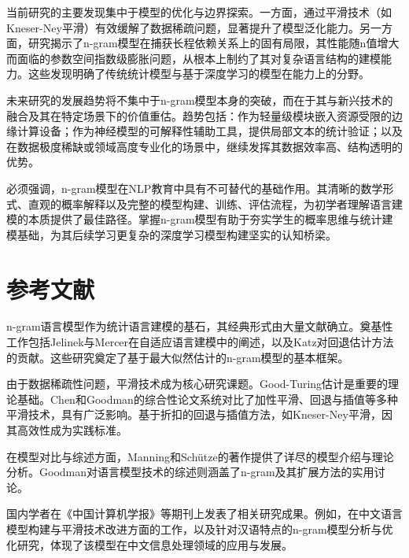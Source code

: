 \documentclass[10pt,a4paper,twocolumn]{article}
\begin{document}
当前研究的主要发现集中于模型的优化与边界探索。一方面，通过平滑技术（如Kneser-Ney平滑）有效缓解了数据稀疏问题，显著提升了模型泛化能力\cite{anonndkneser1995improved}。另一方面，研究揭示了n-gram模型在捕获长程依赖关系上的固有局限，其性能随n值增大而面临的参数空间指数级膨胀问题，从根本上制约了其对复杂语言结构的建模能力。这些发现明确了传统统计模型与基于深度学习的模型在能力上的分野。

未来研究的发展趋势将不集中于n-gram模型本身的突破，而在于其与新兴技术的融合及其在特定场景下的价值重估。趋势包括：作为轻量级模块嵌入资源受限的边缘计算设备；作为神经模型的可解释性辅助工具，提供局部文本的统计验证；以及在数据极度稀缺或领域高度专业化的场景中，继续发挥其数据效率高、结构透明的优势。

必须强调，n-gram模型在NLP教育中具有不可替代的基础作用。其清晰的数学形式、直观的概率解释以及完整的模型构建、训练、评估流程，为初学者理解语言建模的本质提供了最佳路径。掌握n-gram模型有助于夯实学生的概率思维与统计建模基础，为其后续学习更复杂的深度学习模型构建坚实的认知桥梁。


\section{ 参考文献 }
n-gram语言模型作为统计语言建模的基石，其经典形式由大量文献确立。奠基性工作包括Jelinek与Mercer在自适应语言建模中的阐述\cite{anonndjelinek80}，以及Katz对回退估计方法的贡献\cite{kamgarpour2023differential}。这些研究奠定了基于最大似然估计的n-gram模型的基本框架。

由于数据稀疏性问题，平滑技术成为核心研究课题。Good-Turing估计是重要的理论基础\cite{anonndgood53}。Chen和Goodman的综合性论文系统对比了加性平滑、回退与插值等多种平滑技术，具有广泛影响\cite{anonndchen99}。基于折扣的回退与插值方法，如Kneser-Ney平滑，因其高效性成为实践标准\cite{anonndkneser95}。

在模型对比与综述方面，Manning和Schütze的著作提供了详尽的模型介绍与理论分析\cite{anonndmanning99}。Goodman对语言模型技术的综述则涵盖了n-gram及其扩展方法的实用讨论\cite{anonndgoodman01}。

国内学者在《中国计算机学报》等期刊上发表了相关研究成果。例如，在中文语言模型构建与平滑技术改进方面的工作\cite{anonndzhang_cjc}，以及针对汉语特点的n-gram模型分析与优化研究\cite{anonndli_cjc}，体现了该模型在中文信息处理领域的应用与发展。




\printbibliography[title={参考文献}]
\end{document}
